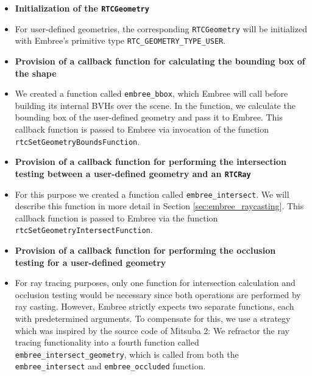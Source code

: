 \begin{itemize}
	\setlength\itemsep{0.05em}
	
	\item \textbf{Initialization of the \texttt{RTCGeometry}}
	\item[] For user-defined geometries, the corresponding \texttt{RTCGeometry} will be initialized with Embree's primitive type \texttt{RTC\_GEOMETRY\_TYPE\_USER}.
	\\
	
	\item \textbf{Provision of a callback function for calculating the bounding box of the shape}
	\item[] We created a function called \texttt{embree\_bbox}, which Embree will call before building its internal BVHs over the scene. In the function, we calculate the bounding box of the user-defined geometry and pass it to Embree. This callback function is passed to Embree via invocation of the function \texttt{rtcSetGeometryBoundsFunction}.
	\\
	
	\item \textbf{Provision of a callback function for performing the intersection testing between a user-defined geometry and an \texttt{RTCRay}}
	\item[] For this purpose we created a function called \texttt{embree\_intersect}. We will describe this function in more detail in Section \ref{sec:embree_raycasting}. This callback function is passed to Embree via the function \texttt{rtcSetGeometryIntersectFunction}.
	\\
	
	\item \textbf{Provision of a callback function for performing the occlusion testing for a user-defined geometry}
	\item[] For ray tracing purposes, only one function for intersection calculation and occlusion testing would be necessary since both operations are performed by ray casting. However, Embree strictly expects two separate functions, each with predetermined arguments. To compensate for this, we use a strategy which was inspired by the source code of Mitsuba 2: We refractor the ray tracing functionality into a fourth function called \texttt{embree\_intersect\_geometry}, which is called from both the \texttt{embree\_intersect} and \texttt{embree\_occluded} function. 
	
\end{itemize}

